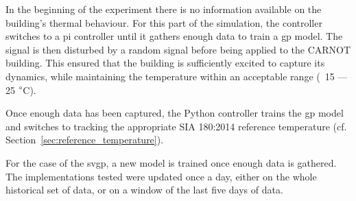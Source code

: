 In the beginning of the experiment there is no information available on the
building's thermal behaviour. For this part of the simulation, the controller
switches to a \acrshort{pi} controller until it gathers enough data to train a
\acrshort{gp} model. The signal is then disturbed by a random signal before
being applied to the CARNOT building. This ensured that the building is
sufficiently excited to capture its dynamics, while maintaining the
temperature within an acceptable range (~15 --- 25 $\degree$C).

Once enough data has been captured, the Python controller trains the
\acrshort{gp} model and switches to tracking the appropriate SIA 180:2014
reference temperature (cf. Section~\ref{sec:reference_temperature}).

For the case of the \acrshort{svgp}, a new model is trained once enough data is
gathered. The implementations tested were updated once a day, either on the
whole historical set of data, or on a window of the last five days of data.


\clearpage
